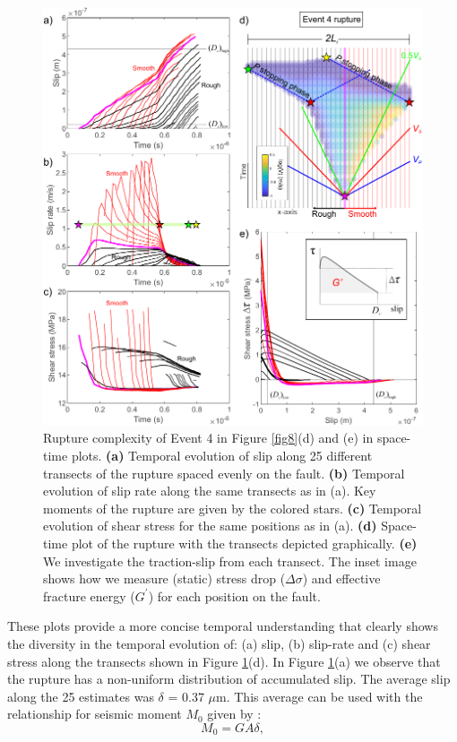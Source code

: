 \documentclass[final,3p, 11pt,authoryear]{elsarticle}
\begin{document}
\begin{figure}
	\centering
	\includegraphics{FIG9.pdf} 
	\caption{Rupture complexity of Event 4 in Figure \ref{fig8}(d) and (e) in space-time plots.  \textbf{(a)} Temporal evolution of slip along 25 different transects of the rupture spaced evenly on the fault. \textbf{(b)} Temporal evolution of slip rate along the same transects as in (a). Key moments of the rupture are given by the colored stars. \textbf{(c)} Temporal evolution of shear stress for the same positions as in (a). \textbf{(d)} Space-time plot of the rupture with the transects depicted graphically. \textbf{(e)} We investigate the traction-slip from each transect. The inset image shows how we measure (static) stress drop ($\Delta \sigma$) and effective fracture energy ($G^{'}$) for each position on the fault.}
	\label{fig9}
	
\end{figure}

These plots provide a more concise temporal understanding that clearly shows the diversity in the temporal evolution of: (a) slip, (b) slip-rate and (c) shear stress along the transects shown in Figure \ref{fig9}(d). In Figure \ref{fig9}(a) we observe that the rupture has a non-uniform distribution of accumulated slip. The average slip along the 25 estimates was $\delta$ = 0.37 $\mu$m.  This average can be used with the relationship for seismic moment $M_{0}$ given by \citet{Aki1966}: 
\begin{equation}
M_{0} = G A \delta, 
\label{eq9}
\end{equation}
\end{document}
